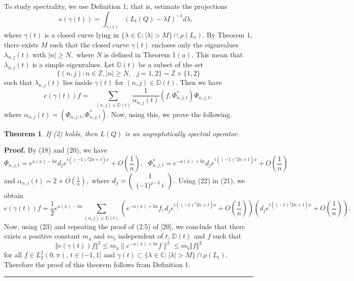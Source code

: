 \documentclass{article}%
\newtheorem{theorem}{Theorem}
{}
\newenvironment{proof}[1][Proof]{\textbf{#1.} }{\ \rule{0.5em}{0.5em}}
\begin{document}
To study spectrality, we use Definition 1; that is, estimate the projections
\[
e(\gamma(t))=\int_{\gamma(t)}\left(  L_{t}(Q)-\lambda I\right)  ^{-1}%
d\lambda,\text{ }%
\]
where $\gamma(t)$ is a closed curve lying in $\{\lambda\in\mathbb{C}%
:\mid\lambda\mid>M\}\cap\rho\left(  L_{t}\right)  $. By Theorem 1, there
exists $M$ such that the closed curve $\gamma(t)$ encloses only the
eigenvalues $\lambda_{n,j}(t)$ with $\mid n\mid\geq N,$ where $N$ is defined
in Theorem 1$(a).$ This mean that $\lambda_{n,j}(t)$ is a simple eigenvalues.
Let $\mathbb{D}(t)$ be a subset of the set
\[
\{(n,j):n\in\mathbb{Z},\mid n\mid\geq N,\text{ }j=1,2\}=\mathbb{Z}%
\times\{1,2\}
\]
such that $\lambda_{n,j}(t)$ lies inside $\gamma(t)$ for $\left(  n,j\right)
\in\mathbb{D}(t).$ Then we have
\begin{equation}
e(\gamma(t))f=\text{ }\sum_{\left(  n,j\right)  \in\mathbb{D}(t)}\frac
{1}{\alpha_{n,j}(t)}(f,\Phi_{n,j,t}^{\ast})\Phi_{n,j,t}, \tag{21}%
\end{equation}
where $\alpha_{n,j}(t)=(\Phi_{n,j,t},\Phi_{n,j,t}^{\ast}).$ Now, using this,
we prove the following.

\begin{theorem}
If (2) holds, then $L(Q)$ is an asymptotically spectral operator.
\end{theorem}

\begin{proof}
By (18) and (20), we have
\begin{equation}
\Phi_{n,j,t}=e^{a(x)-bx}d_{j}e^{i(\left(  -1\right)  ^{j}2n+t)x}+O(\frac{1}%
{n}),\text{ }\Phi_{n,j,t}^{\ast}=e^{-\overline{a(x)}+\overline{b}x}%
d_{j}e^{i(\left(  -1\right)  ^{j}2n+t)x}+O(\frac{1}{n}) \tag{22}%
\end{equation}
and $\alpha_{n,j}(t)=2+O(\frac{1}{n}),$ where $d_{j}=\left(
\begin{array}
[c]{c}%
1\\
\left(  -1\right)  ^{j-1}i
\end{array}
\right)  .$ Using (22) in (21), we obtain
\begin{equation}
e(\gamma(t))f=\frac{1}{2}e^{a(x)-bx}\sum_{\left(  n,j\right)  \in
\mathbb{D}(t)}\left(  e^{-a(x)+bx}f,d_{j}e^{i(\left(  -1\right)  ^{j}%
2n+t)x}+O(\frac{1}{n})\right)  \left(  d_{j}e^{i(\left(  -1\right)
^{j}2n+t)x}+O(\frac{1}{n})\right)  . \tag{23}%
\end{equation}
Now, using (23) and repeating the proof of (2.5) of [20], we conclude that
there exists a positive constant $m_{4}$ and $m_{5}$ independent of $t$,
$\mathbb{D}(t)$ and $f$ such that
\begin{equation}
\left\Vert e(\gamma(t))f\right\Vert ^{2}\leq m_{4}\parallel e^{-a(x)+bx}%
f\parallel^{2}\leq m_{5}\left\Vert f\right\Vert ^{2} \tag{24}%
\end{equation}
for all $f\in L_{2}^{2}(0,\pi)$, $t\in(-1,1]$ and $\gamma(t)\subset
\{\lambda\in\mathbb{C}:\mid\lambda\mid>M\}\cap\rho\left(  L_{t}\right)  .$
Therefore the proof of this theorem follows from Definition 1.
\end{proof}
\end{document}
